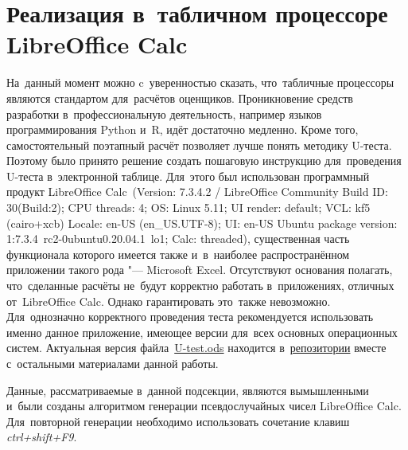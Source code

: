 \documentclass[]{scrreprt}
\begin{document}
\section{Реализация в~табличном процессоре LibreOffice Calc}\label{U-test-spreadsheet}
На~данный момент можно c~уверенностью сказать, что~табличные процессоры являются стандартом для~расчётов оценщиков. Проникновение средств разработки в~профессиональную деятельность, например языков программирования Python и~R,  идёт достаточно медленно. Кроме того, самостоятельный поэтапный расчёт позволяет лучше понять методику U-теста. Поэтому было принято решение создать пошаговую инструкцию для~проведения U-теста в~электронной таблице. Для~этого был использован программный продукт LibreOffice Calc~(Version: 7.3.4.2 / LibreOffice Community Build ID: 30(Build:2); CPU threads: 4; OS: Linux 5.11; UI render: default; VCL: kf5 (cairo+xcb) Locale: en-US (en\_US.UTF-8); UI: en-US Ubuntu package version: 1:7.3.4~rc2-0ubuntu0.20.04.1~lo1; Calc: threaded), существенная часть функционала которого имеется также и~в~наиболее распространённом приложении такого рода "--- \foreignlanguage{english}{Microsoft Excel}. Отсутствуют основания полагать, что~сделанные расчёты не~будут корректно работать в~приложениях, отличных от~LibreOffice Calc. Однако гарантировать это~также невозможно. Для~однозначно корректного проведения теста рекомендуется использовать именно данное приложение, имеющее версии для~всех основных операционных систем. Актуальная версия файла~\href{https://github.com/Kirill-Murashev/AI_for_valuers_book/blob/main/Parts-Chapters/Mann-Whitney-Wilcoxon/U-test.ods}{U-test.ods} находится в~\href{https://github.com/Kirill-Murashev/AI_for_valuers_book/tree/main/Parts&Chapters/Mann-Whitney-Wilcoxon}{репозитории} вместе с~остальными материалами данной работы.

Данные, рассматриваемые в~данной подсекции, являются вымышленными и~были созданы алгоритмом генерации псевдослучайных чисел LibreOffice Calc. Для~повторной генерации необходимо использовать сочетание клавиш \emph{ctrl+shift+F9}. 
\end{document}

